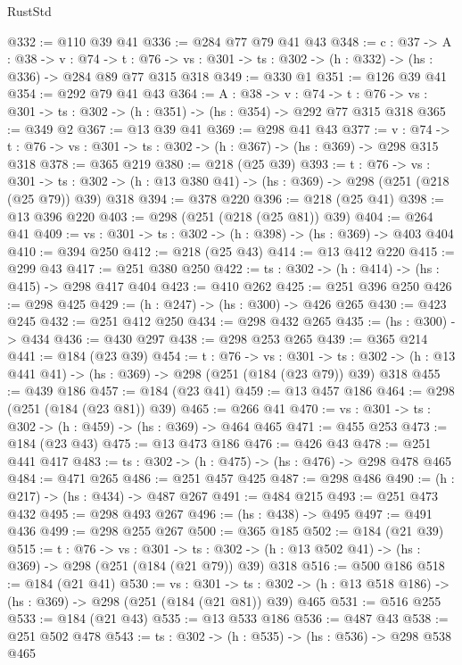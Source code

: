 \begin{lexlean}{RustStd}
\begin{coremodule}
@332 := @110 @39 @41
@336 := @284 @77 @79 @41 @43
@348 := {c : @37} ->
  {A : @38} ->
  {v : @74} ->
  {t : @76} -> {vs : @301} -> {ts : @302} -> (h : @332) -> (hs : @336) -> @284 @89 @77 @315 @318
@349 := @330 @1
@351 := @126 @39 @41
@354 := @292 @79 @41 @43
@364 := {A : @38} ->
  {v : @74} ->
  {t : @76} -> {vs : @301} -> {ts : @302} -> (h : @351) -> (hs : @354) -> @292 @77 @315 @318
@365 := @349 @2
@367 := @13 @39 @41
@369 := @298 @41 @43
@377 := {v : @74} ->
  {t : @76} -> {vs : @301} -> {ts : @302} -> (h : @367) -> (hs : @369) -> @298 @315 @318
@378 := @365 @219
@380 := @218 (@25 @39)
@393 := {t : @76} ->
  {vs : @301} ->
  {ts : @302} -> (h : @13 @380 @41) -> (hs : @369) -> @298 (@251 (@218 (@25 @79)) @39) @318
@394 := @378 @220
@396 := @218 (@25 @41)
@398 := @13 @396 @220
@403 := @298 (@251 (@218 (@25 @81)) @39)
@404 := @264 @41
@409 := {vs : @301} -> {ts : @302} -> (h : @398) -> (hs : @369) -> @403 @404
@410 := @394 @250
@412 := @218 (@25 @43)
@414 := @13 @412 @220
@415 := @299 @43
@417 := @251 @380 @250
@422 := {ts : @302} -> (h : @414) -> (hs : @415) -> @298 @417 @404
@423 := @410 @262
@425 := @251 @396 @250
@426 := @298 @425
@429 := (h : @247) -> (hs : @300) -> @426 @265
@430 := @423 @245
@432 := @251 @412 @250
@434 := @298 @432 @265
@435 := (hs : @300) -> @434
@436 := @430 @297
@438 := @298 @253 @265
@439 := @365 @214
@441 := @184 (@23 @39)
@454 := {t : @76} ->
  {vs : @301} ->
  {ts : @302} -> (h : @13 @441 @41) -> (hs : @369) -> @298 (@251 (@184 (@23 @79)) @39) @318
@455 := @439 @186
@457 := @184 (@23 @41)
@459 := @13 @457 @186
@464 := @298 (@251 (@184 (@23 @81)) @39)
@465 := @266 @41
@470 := {vs : @301} -> {ts : @302} -> (h : @459) -> (hs : @369) -> @464 @465
@471 := @455 @253
@473 := @184 (@23 @43)
@475 := @13 @473 @186
@476 := @426 @43
@478 := @251 @441 @417
@483 := {ts : @302} -> (h : @475) -> (hs : @476) -> @298 @478 @465
@484 := @471 @265
@486 := @251 @457 @425
@487 := @298 @486
@490 := (h : @217) -> (hs : @434) -> @487 @267
@491 := @484 @215
@493 := @251 @473 @432
@495 := @298 @493 @267
@496 := (hs : @438) -> @495
@497 := @491 @436
@499 := @298 @255 @267
@500 := @365 @185
@502 := @184 (@21 @39)
@515 := {t : @76} ->
  {vs : @301} ->
  {ts : @302} -> (h : @13 @502 @41) -> (hs : @369) -> @298 (@251 (@184 (@21 @79)) @39) @318
@516 := @500 @186
@518 := @184 (@21 @41)
@530 := {vs : @301} ->
  {ts : @302} -> (h : @13 @518 @186) -> (hs : @369) -> @298 (@251 (@184 (@21 @81)) @39) @465
@531 := @516 @255
@533 := @184 (@21 @43)
@535 := @13 @533 @186
@536 := @487 @43
@538 := @251 @502 @478
@543 := {ts : @302} -> (h : @535) -> (hs : @536) -> @298 @538 @465

\end{coremodule}
\end{lexlean}
